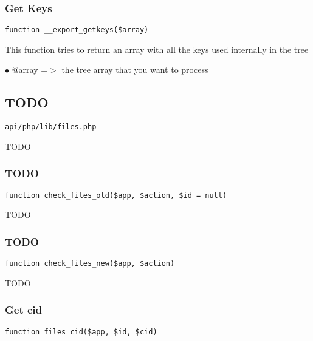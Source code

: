 \documentclass[a4paper]{article}
\begin{document}
\hypertarget{toc444}{}
\subsubsection{Get Keys}

\begin{lstlisting}
function __export_getkeys($array)
\end{lstlisting}

This function tries to return an array with all the keys used internally
in the tree

\begin{compactitem}
\item[\color{myblue}$\bullet$] @array =$>$ the tree array that you want to process
\end{compactitem}

\hypertarget{toc445}{}
\subsection{TODO}

\begin{lstlisting}
api/php/lib/files.php
\end{lstlisting}

TODO

\hypertarget{toc446}{}
\subsubsection{TODO}

\begin{lstlisting}
function check_files_old($app, $action, $id = null)
\end{lstlisting}

TODO

\hypertarget{toc447}{}
\subsubsection{TODO}

\begin{lstlisting}
function check_files_new($app, $action)
\end{lstlisting}

TODO

\hypertarget{toc448}{}
\subsubsection{Get cid}

\begin{lstlisting}
function files_cid($app, $id, $cid)
\end{lstlisting}
\end{document}
